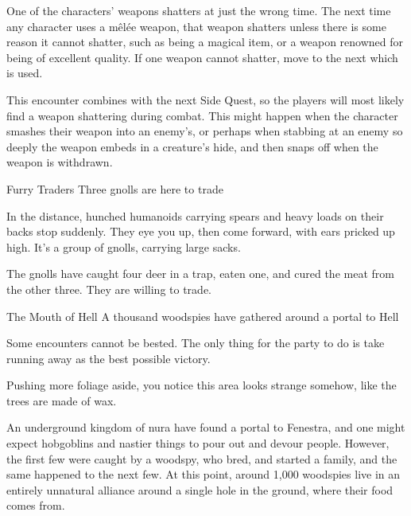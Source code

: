 \begin{multicols}{2}
\begin{boxtext}
\end{boxtext}

One of the characters' weapons shatters at just the wrong time.
The next time any character uses a m\^el\'ee weapon, that weapon shatters unless there is some reason it cannot shatter, such as being a magical item, or a weapon renowned for being of excellent quality.
If one weapon cannot shatter, move to the next which is used.

This encounter combines with the next Side Quest, so the players will most likely find a weapon shattering during combat.
This might happen when the character smashes their weapon into an enemy's, or perhaps when stabbing at an enemy so deeply the weapon embeds in a creature's hide, and then snaps off when the weapon is withdrawn.

{Furry Traders}%
{Three gnolls are here to trade}%

\begin{boxtext}

  In the distance, hunched humanoids carrying spears and heavy loads on their backs stop suddenly.
  They eye you up, then come forward, with ears pricked up high.
  It's a group of gnolls, carrying large sacks.

\end{boxtext}

The gnolls have caught four deer in a trap, eaten one, and cured the meat from the other three.  They are willing to trade.


{\N The Mouth of Hell}%
{A thousand woodspies have gathered around a portal to Hell}%

Some encounters cannot be bested. The only thing for the party to do is take running away as the best possible victory.

\begin{boxtext}

  Pushing more foliage aside, you notice this area looks strange somehow, like the trees are made of wax.

\end{boxtext}

An underground kingdom of nura have found a portal to Fenestra, and one might expect hobgoblins and nastier things to pour out and devour people.
However, the first few were caught by a woodspy, who bred, and started a family, and the same happened to the next few.
At this point, around 1,000 woodspies live in an entirely unnatural alliance around a single hole in the ground, where their food comes from.


\end{multicols}

